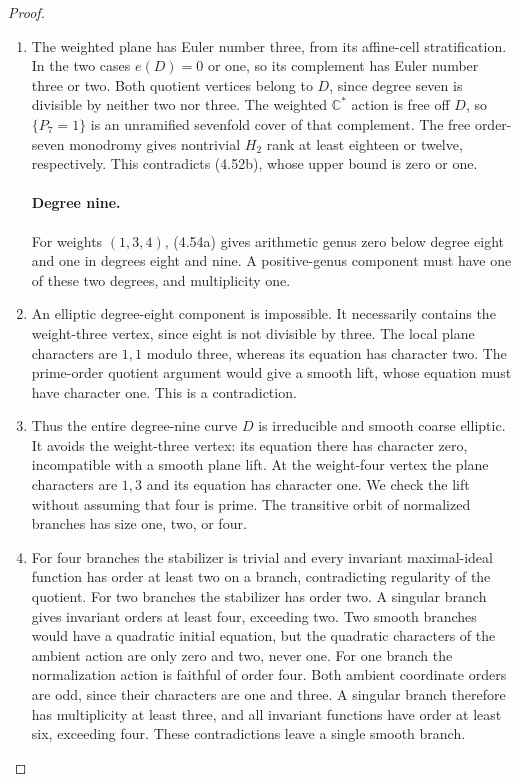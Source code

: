 \begin{proof}
\begin{enumerate}[label={$\langle1\rangle$\arabic*.},leftmargin=*]
\item The weighted plane has Euler number three,
from its affine-cell stratification. In the
two cases $e(D)=0$ or one, so its complement
has Euler number three or two. Both quotient
vertices belong to $D$, since degree seven
is divisible by neither two nor three.
The weighted $\mathbb C^*$ action is free
off $D$, so $\{P_7=1\}$ is an unramified
sevenfold cover of that complement. The
free order-seven monodromy gives nontrivial
$H_2$ rank at least eighteen or twelve,
respectively. This contradicts (4.52b),
whose upper bound is zero or one.

\paragraph{Degree nine.}
For weights $(1,3,4)$, (4.54a) gives
arithmetic genus zero below degree eight
and one in degrees eight and nine.
A positive-genus component must have one
of these two degrees, and multiplicity one.

\item An elliptic degree-eight component is
impossible. It necessarily contains the
weight-three vertex, since eight is not
divisible by three. The local plane
characters are $1,1$ modulo three, whereas
its equation has character two. The
prime-order quotient argument would give
a smooth lift, whose equation must have
character one. This is a contradiction.

\item Thus the entire degree-nine curve $D$ is
irreducible and smooth coarse elliptic.
It avoids the weight-three vertex: its
equation there has character zero,
incompatible with a smooth plane lift.
At the weight-four vertex the plane
characters are $1,3$ and its equation
has character one. We check the lift
without assuming that four is prime.
The transitive orbit of normalized
branches has size one, two, or four.

\item For four branches the stabilizer is
trivial and every invariant maximal-ideal
function has order at least two on a
branch, contradicting regularity of the
quotient. For two branches the stabilizer
has order two. A singular branch gives
invariant orders at least four, exceeding
two. Two smooth branches would have a
quadratic initial equation, but the
quadratic characters of the ambient
action are only zero and two, never one.
For one branch the normalization action
is faithful of order four. Both ambient
coordinate orders are odd, since their
characters are one and three. A singular
branch therefore has multiplicity at
least three, and all invariant functions
have order at least six, exceeding four.
These contradictions leave a single
smooth branch.


\end{enumerate}
\end{proof}
